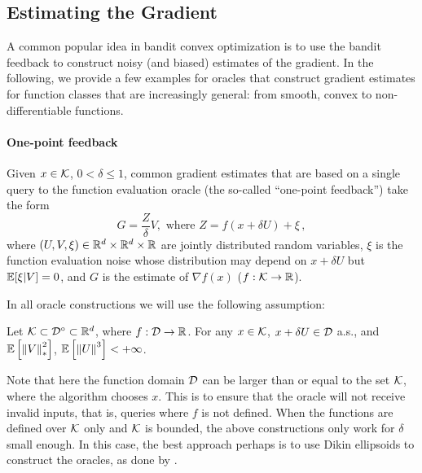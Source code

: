 \subsection{Estimating the Gradient}

A common popular idea in bandit convex optimization is to use the bandit feedback to construct noisy (and biased) estimates of the gradient.
In the following, we provide a few examples for oracles that construct gradient estimates for function classes that are increasingly general: from smooth, convex to non-differentiable functions.

\paragraph{One-point feedback}
Given $x\in \mathcal{K}$, $0<\delta\le 1$, common gradient estimates that are
based on a single query to the function evaluation oracle (the so-called
``one-point feedback'') take the form 
\begin{equation}
  \label{eq:one-point}
G = \frac{Z}{\delta}V, \textrm{ where } Z = f(x+\delta U) + \xi\,,
\end{equation}
where $(U,V,\xi)\in \mathbb{R}^d\times \mathbb{R}^d\times \mathbb{R}$ are jointly distributed random variables,
$\xi$ is the function evaluation noise whose distribution may depend on $x+\delta U$ but $\mathbb{E}[\xi|V]=0$, and $G$ is the estimate of $\nabla f(x)$ ($f:\mathcal{K}\to \mathbb{R}$). 

In all oracle constructions we will use the following assumption:
\begin{ass}
  \label{ass:gradbasic}
  Let $\mathcal{K} \subset \mathcal{D}^\circ \subset \mathbb{R}^d$, where $f:\mathcal{D} \to \mathbb{R}$. %
  For any $x\in \mathcal{K}$, $x+\delta U \in \mathcal{D}$ a.s.,
  and $\mathbb{E}\left[\left\|V\right\|_*^2\right]$, $\mathbb{E}\left[ \left\|U\right\|^3 \right]<+\infty$.
\end{ass}
Note that here the function domain $\mathcal{D}$ can be larger than or equal to the set $\mathcal{K}$, where the algorithm chooses $x$. This is to ensure that the oracle will not receive invalid inputs, that is, queries where $f$ is not defined.
When the functions are defined over $\mathcal{K}$ only and $\mathcal{K}$ is bounded, the above constructions only work for $\delta$ small enough.
In this case, the best approach perhaps is to use Dikin ellipsoids to construct the oracles, as done by \citet{HaLe14:SOC}.

